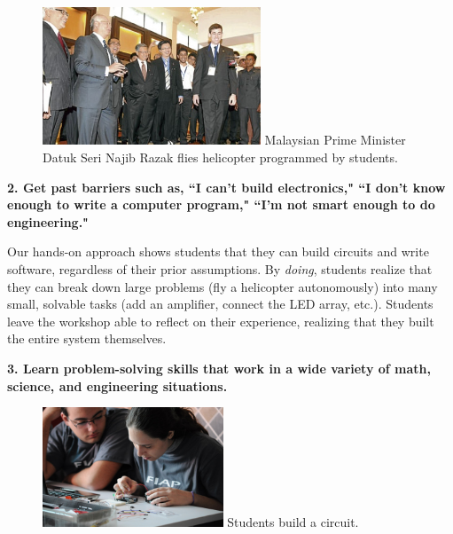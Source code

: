 \documentclass[11pt]{article}
\begin{document}
\vspace{20pt}
\begin{figure}
    \begin{center}
    \includegraphics[width=0.58\textwidth]{figures/malaysia-prime-minister.jpg}
    {\small Malaysian Prime Minister Datuk Seri Najib Razak flies helicopter programmed by students.\footnotemark}
    \end{center}
    \vspace{-20pt}
\end{figure}

\textbf{2. Get past barriers such as, ``I can't build electronics," ``I don't know enough to write a computer program," ``I'm not smart enough to do engineering."}

Our hands-on approach shows students that they can build circuits and write software, regardless of their prior assumptions.  By \textit{doing}, students realize that they can break down large problems (fly a helicopter autonomously) into many small, solvable tasks (add an amplifier, connect the LED array, etc.).  Students leave the workshop able to reflect on their experience, realizing that they built the entire system themselves.

\newpage
\textbf{3. Learn problem-solving skills that work in a wide variety of math, science, and engineering situations.}

\begin{figure}
    \begin{center}
    \includegraphics[width=0.48\textwidth]{figures/fiap_workshop2.jpg}
    {\small Students build a circuit.\footnotemark\vspace{10pt}}
    \end{center}
    \vspace{-20pt}
\end{figure}
\end{document}
